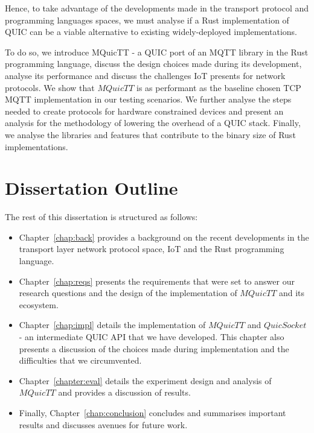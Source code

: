 Hence, to take advantage of the developments made in the transport protocol and programming languages spaces, we must analyse if a Rust implementation of QUIC can be a viable alternative to existing widely-deployed implementations.

To do so, we introduce MQuicTT - a QUIC port of an MQTT library in the Rust programming language, discuss the design choices made during its development, analyse its performance and discuss the challenges IoT presents for network protocols.
We show that $MQuicTT$ is as performant as the baseline chosen TCP MQTT implementation in our testing scenarios.
We further analyse the steps needed to create protocols for hardware constrained devices and present an analysis for the methodology of lowering the overhead of a QUIC stack.
Finally, we analyse the libraries and features that contribute to the binary size of Rust implementations.

\section{Dissertation Outline}

The rest of this dissertation is structured as follows:
\begin{itemize}
    \item Chapter~\ref{chap:back} provides a background on the recent developments in the transport layer network protocol space, IoT and the Rust programming language.
    \item Chapter~\ref{chap:reqs} presents the requirements that were set to answer our research questions and the design of the implementation of $MQuicTT$ and its ecosystem.
    \item Chapter~\ref{chap:impl} details the implementation of $MQuicTT$ and $QuicSocket$ - an intermediate QUIC API that we have developed. This chapter also presents a discussion of the choices made during implementation and the difficulties that we circumvented.
    \item Chapter~\ref{chapter:eval} details the experiment design and analysis of $MQuicTT$ and provides a discussion of results.
    \item Finally, Chapter~\ref{chap:conclusion} concludes and summarises important results and discusses avenues for future work.
\end{itemize}